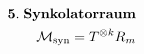 \documentclass[preview]{standalone}
\begin{document}
\begin{align*}
\special{dvisvgm:raw <g id='unique000'>}\mathbf{5.\;Synkolatorraum}\\\mathcal{M}_{\text{syn}}=T^{\otimes k}R_m\special{dvisvgm:raw </g>}
\end{align*}
\end{document}
